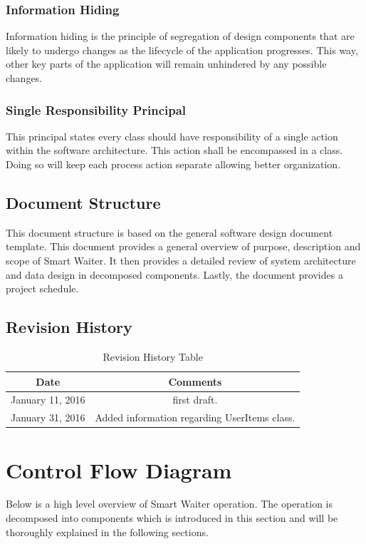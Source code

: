 \documentclass[12pt, titlepage]{article}
\begin{document}
\subsubsection{Information Hiding}
Information hiding is the principle of segregation of design components that are likely to undergo changes as the lifecycle of the application progresses. This way, other key parts of the application will remain unhindered by any possible changes.

\subsubsection{Single Responsibility Principal}
This principal states every class should have responsibility of a single action within the software architecture. This action shall be encompassed in a class. Doing so will keep each process action separate allowing better organization. 

\subsection{Document Structure}
This document structure is based on the general software design document template. This document provides a general overview of purpose, description and scope of Smart Waiter. It then provides a detailed review of system architecture and data design in decomposed components. Lastly, the document provides a project schedule. 

\subsection{Revision History}

\begin{table}[H]
\begin{tabular}{|c|c|}
\hline
\textbf{Date}  & \textbf{Comments} \\ \hline
January 11, 2016 &  first draft. \\ 
January 31, 2016 &  Added information regarding UserItems class. \\ 
\hline
\end{tabular}
\caption{Revision History Table}
\end{table}

\section{Control Flow Diagram}
Below is a high level overview of Smart Waiter operation. The operation is decomposed into components which is introduced in this section and will be thoroughly explained in the following sections. 
\end{document}
